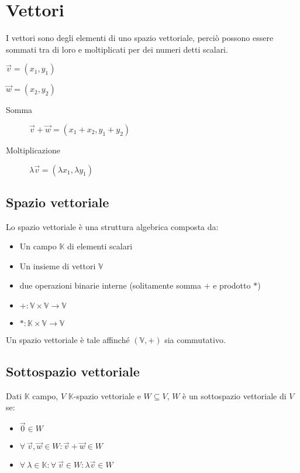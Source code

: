 \documentclass{subfiles}
\begin{document}
\section{Vettori}

I vettori sono degli elementi di uno spazio vettoriale, perciò possono essere sommati tra di loro e moltiplicati per dei numeri detti scalari.

\begin{description}
    \item $\vec{v} = (x_1, y_1)$
    \item $\vec{w} = (x_2, y_2)$
\end{description}

\begin{description}
    \item[Somma] $\vec{v} + \vec{w} = (x_1 + x_2, y_1 + y_2)$
    \item[Moltiplicazione] $\lambda \vec{v} = (\lambda x_1, \lambda y_1)$
\end{description}

\subsection{Spazio vettoriale}

Lo spazio vettoriale è una struttura algebrica composta da:

\begin{itemize}
\item Un campo $\mathbb{K}$ di elementi scalari
\item Un insieme di vettori $\mathbb{V}$
\item due operazioni binarie interne (solitamente somma $+$ e prodotto $*$)
    \item $+: \mathbb{V} \times \mathbb{V} \to \mathbb{V}$
    \item $*: \mathbb{K} \times \mathbb{V} \to \mathbb{V}$
\end{itemize}

\noindent
Un spazio vettoriale è tale affinché $(\mathbb{V}, +)$ sia commutativo.

\subsection{Sottospazio vettoriale}

Dati $\mathbb{K}$ campo, $V$ $\mathbb{K}$-spazio vettoriale e $W \subseteq V$, $W$ è un sottospazio vettoriale di $V$ se:

\begin{itemize}
    \item $\vec{0} \in W$
    \item $\forall \ \vec{v}, \vec{w} \in W : \vec{v} + \vec{w} \in W$
    \item $\forall \ \lambda \in \mathbb{K} : \forall \ \vec{v} \in W : \lambda \vec{v} \in W$
\end{itemize}
\end{document}
